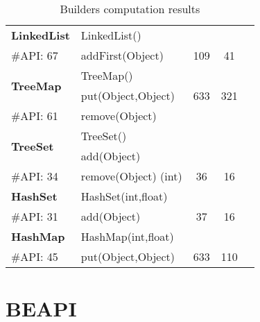 \begin{table}[t!]
{\begin{tabular}{l l ccc}
\hline

\multirow{1}{*}{\textbf{LinkedList}} 
 & LinkedList()& &\\
 {\scriptsize \#API: 67}&  addFirst(Object) &109   &41 \\
 \hline

\multirow{2}{*}{\textbf{TreeMap}} 
 & TreeMap()& &\\
 & put(Object,Object) & 633 & 321 \\
{\scriptsize \#API: 61}&  remove(Object) & &\\
\hline

\multirow{2}{*}{\textbf{TreeSet}} 
 & TreeSet()& &\\
 & add(Object) &   & \\
{\scriptsize \#API: 34}&  remove(Object) (int) & 36 & 16\\
\hline

\multirow{1}{*}{\textbf{HashSet}} 
 & HashSet(int,float)& &\\
 {\scriptsize \#API: 31}&  add(Object) & 37  &16 \\
\hline

\multirow{1}{*}{\textbf{HashMap}} 
 & HashMap(int,float)& &\\
{\scriptsize \#API: 45}& put(Object,Object) &  633 &110 \\
\hline

\end{tabular}%
}

\caption{Builders computation results}
\label{tab:results-compute-bld}
\end{table}

\hspace{1cm}




\section{BEAPI}

